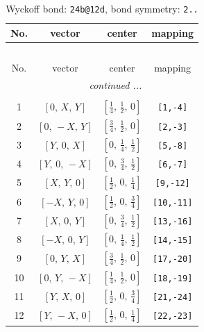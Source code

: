 \documentclass[fleqn,8pt]{jsarticle}
\begin{document}
\renewcommand{\arraystretch}{1.2}
\begin{longtable}{cccc}
\caption{Wyckoff bond: {\tt 24b@12d}, bond symmetry: {\tt 2..}}
 \\
 \hline \hline
No. & vector & center & mapping \\ \hline \endfirsthead

\multicolumn{3}{l}{\tablename\ \thetable{}} \\
 \hline \hline
No. & vector & center & mapping \\ \hline \endhead

 \hline \hline
\multicolumn{3}{r}{\footnotesize\it continued ...} \\ \endfoot

 \hline \hline
\multicolumn{3}{r}{} \\ \endlastfoot

1 & $\left[ 0,\, X,\, Y \right]$ & $\left[ \frac{1}{4},\, \frac{1}{2},\, 0 \right]$ & {\tt [1,-4]} \\ \hline
2 & $\left[ 0,\, - X,\, Y \right]$ & $\left[ \frac{3}{4},\, \frac{1}{2},\, 0 \right]$ & {\tt [2,-3]} \\ \hline
3 & $\left[ Y,\, 0,\, X \right]$ & $\left[ 0,\, \frac{1}{4},\, \frac{1}{2} \right]$ & {\tt [5,-8]} \\ \hline
4 & $\left[ Y,\, 0,\, - X \right]$ & $\left[ 0,\, \frac{3}{4},\, \frac{1}{2} \right]$ & {\tt [6,-7]} \\ \hline
5 & $\left[ X,\, Y,\, 0 \right]$ & $\left[ \frac{1}{2},\, 0,\, \frac{1}{4} \right]$ & {\tt [9,-12]} \\ \hline
6 & $\left[ - X,\, Y,\, 0 \right]$ & $\left[ \frac{1}{2},\, 0,\, \frac{3}{4} \right]$ & {\tt [10,-11]} \\ \hline
7 & $\left[ X,\, 0,\, Y \right]$ & $\left[ 0,\, \frac{3}{4},\, \frac{1}{2} \right]$ & {\tt [13,-16]} \\ \hline
8 & $\left[ - X,\, 0,\, Y \right]$ & $\left[ 0,\, \frac{1}{4},\, \frac{1}{2} \right]$ & {\tt [14,-15]} \\ \hline
9 & $\left[ 0,\, Y,\, X \right]$ & $\left[ \frac{3}{4},\, \frac{1}{2},\, 0 \right]$ & {\tt [17,-20]} \\ \hline
10 & $\left[ 0,\, Y,\, - X \right]$ & $\left[ \frac{1}{4},\, \frac{1}{2},\, 0 \right]$ & {\tt [18,-19]} \\ \hline
11 & $\left[ Y,\, X,\, 0 \right]$ & $\left[ \frac{1}{2},\, 0,\, \frac{3}{4} \right]$ & {\tt [21,-24]} \\ \hline
12 & $\left[ Y,\, - X,\, 0 \right]$ & $\left[ \frac{1}{2},\, 0,\, \frac{1}{4} \right]$ & {\tt [22,-23]} \\
\end{longtable}
\end{document}
